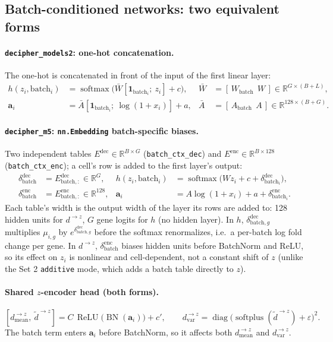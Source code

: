 \documentclass{article}
\newcommand{\batch}{\mathrm{batch}}
\newcommand{\dec}{\mathrm{dec}}
\newcommand{\enc}{\mathrm{enc}}
\newcommand{\one}{\mathbf{1}}
\DeclareMathOperator{\softmax}{softmax}
\DeclareMathOperator{\softplus}{softplus}
\DeclareMathOperator{\ReLU}{ReLU}
\DeclareMathOperator{\BN}{BN}
\DeclareMathOperator{\diag}{diag}
\begin{document}
\subsection{Batch-conditioned networks: two equivalent forms}

\paragraph{\texttt{decipher\_models2}: one-hot concatenation.} The one-hot is concatenated
in front of the input of the first linear layer:
\begin{align*}
h(z_i, \batch_i) &= \softmax\!\big(\bar W [\one_{\batch_i};\ z_i] + c\big),
  & \bar W &= [\,W_{\batch}\ \ W\,] \in \mathbb{R}^{G \times (B + L)}, \\
\mathbf{a}_i &= \bar A [\one_{\batch_i};\ \log(1 + x_i)] + a,
  & \bar A &= [\,A_{\batch}\ \ A\,] \in \mathbb{R}^{128 \times (B + G)}.
\end{align*}

\paragraph{\texttt{decipher\_m5}: \texttt{nn.Embedding} batch-specific biases.} Two independent tables
$E^{\dec} \in \mathbb{R}^{B \times G}$ (\texttt{batch\_ctx\_dec}) and
$E^{\enc} \in \mathbb{R}^{B \times 128}$ (\texttt{batch\_ctx\_enc}); a cell's row is added to
the first layer's output:
\begin{align*}
\delta^{\dec}_{\batch} &= E^{\dec}_{\batch,:} \in \mathbb{R}^{G},
  & h(z_i, \batch_i) &= \softmax\!\big(W z_i + c + \delta^{\dec}_{\batch_i}\big), \\
\delta^{\enc}_{\batch} &= E^{\enc}_{\batch,:} \in \mathbb{R}^{128},
  & \mathbf{a}_i &= A \log(1 + x_i) + a + \delta^{\enc}_{\batch_i}.
\end{align*}
Each table's width is the output width of the layer its rows are added to: 128 hidden units
for $d^{\to z}$, $G$ gene logits for $h$ (no hidden layer).
In $h$, $\delta^{\dec}_{\batch,g}$ multiplies $\mu_{i,g}$ by $e^{\delta^{\dec}_{\batch,g}}$
before the softmax renormalizes, i.e.\ a per-batch log fold change per gene. In $d^{\to z}$,
$\delta^{\enc}_{\batch}$ biases hidden units before BatchNorm and ReLU, so its effect on $z_i$
is nonlinear and cell-dependent, not a constant shift of $z$ (unlike the Set 2
\texttt{additive} mode, which adds a batch table directly to $z$).

\paragraph{Shared $z$-encoder head (both forms).}
\[
[d^{\to z}_{\mathrm{mean}},\ \tilde d^{\to z}] = C \,\ReLU\!\big(\BN(\mathbf{a}_i)\big) + c',
\qquad d^{\to z}_{\mathrm{var}} = \diag\!\big(\softplus(\tilde d^{\to z}) + \varepsilon\big)^2 .
\]
The batch term enters $\mathbf{a}_i$ before BatchNorm, so it affects both
$d^{\to z}_{\mathrm{mean}}$ and $d^{\to z}_{\mathrm{var}}$.
\end{document}
